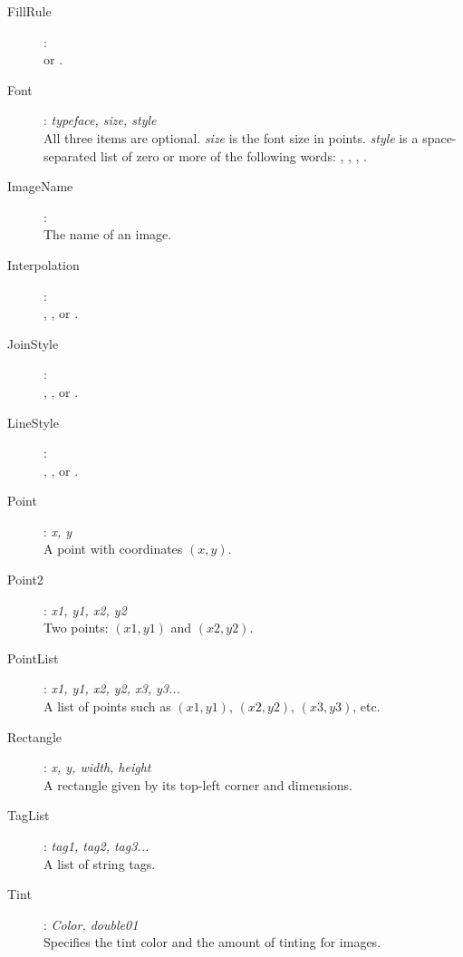 \begin{description}
\item[FillRule]: \\
 or .

\item[Font]: \textit{typeface, size, style} \\
All three items are optional. \textit{size} is the font size in points.
\textit{style} is a space-separated list of zero or more of the following
words: , , , .

\item[ImageName]: \\
The name of an image.

\item[Interpolation]: \\
, , or .

\item[JoinStyle]: \\
, , or .

\item[LineStyle]: \\
, , or .

\item[Point]: \textit{x, y} \\
A point with coordinates $(x,y)$.

\item[Point2]: \textit{x1, y1, x2, y2} \\
Two points: $(x1,y1)$ and $(x2,y2)$.

\item[PointList]: \textit{x1, y1, x2, y2, x3, y3...} \\
A list of points such as $(x1,y1)$, $(x2,y2)$, $(x3,y3)$, etc.

\item[Rectangle]: \textit{x, y, width, height} \\
A rectangle given by its top-left corner and dimensions.

\item[TagList]: \textit{tag1, tag2, tag3...} \\
A list of string tags.

\item[Tint]: \textit{Color, double01} \\
Specifies the tint color and the amount of tinting for images.


\end{description}
